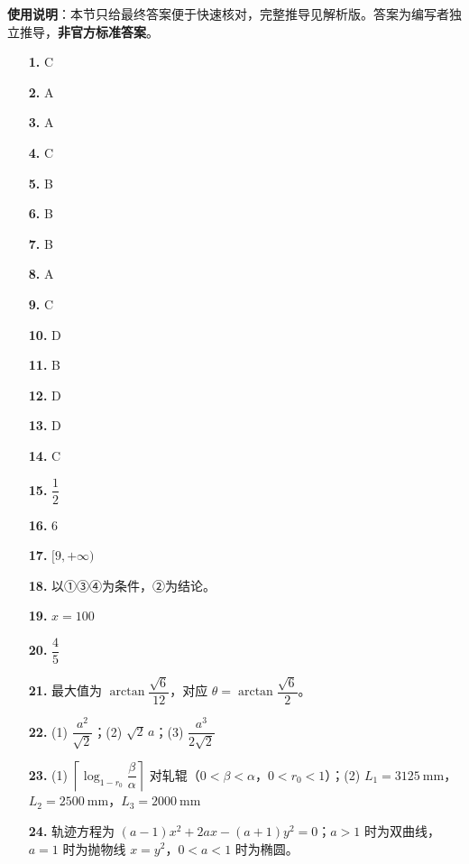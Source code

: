 
\begin{gknotice}
\textbf{使用说明}：本节只给最终答案便于快速核对，完整推导见解析版。答案为编写者独立推导，\textbf{非官方标准答案}。
\end{gknotice}

\begin{itemize}[leftmargin=2.6em]
  \item[\textbf{1.}] C
  \item[\textbf{2.}] A
  \item[\textbf{3.}] A
  \item[\textbf{4.}] C
  \item[\textbf{5.}] B
  \item[\textbf{6.}] B
  \item[\textbf{7.}] B
  \item[\textbf{8.}] A
  \item[\textbf{9.}] C
  \item[\textbf{10.}] D
  \item[\textbf{11.}] B
  \item[\textbf{12.}] D
  \item[\textbf{13.}] D
  \item[\textbf{14.}] C
  \item[\textbf{15.}] $\dfrac12$
  \item[\textbf{16.}] 6
  \item[\textbf{17.}] $[9,+\infty)$
  \item[\textbf{18.}] 以①③④为条件，②为结论。
  \item[\textbf{19.}] $x=100$
  \item[\textbf{20.}] $\dfrac45$
  \item[\textbf{21.}] 最大值为 $\arctan\dfrac{\sqrt6}{12}$，对应 $\theta=\arctan\dfrac{\sqrt6}{2}$。
  \item[\textbf{22.}] (1) $\dfrac{a^2}{\sqrt2}$；(2) $\sqrt2\,a$；(3) $\dfrac{a^3}{2\sqrt2}$
  \item[\textbf{23.}] (1) $\left\lceil\log_{1-r_0}\dfrac{\beta}{\alpha}\right\rceil$ 对轧辊（$0<\beta<\alpha$，$0<r_0<1$）；(2) $L_1=3125\ \mathrm{mm}$，$L_2=2500\ \mathrm{mm}$，$L_3=2000\ \mathrm{mm}$
  \item[\textbf{24.}] 轨迹方程为 $(a-1)x^2+2ax-(a+1)y^2=0$；$a>1$ 时为双曲线，$a=1$ 时为抛物线 $x=y^2$，$0<a<1$ 时为椭圆。
\end{itemize}
